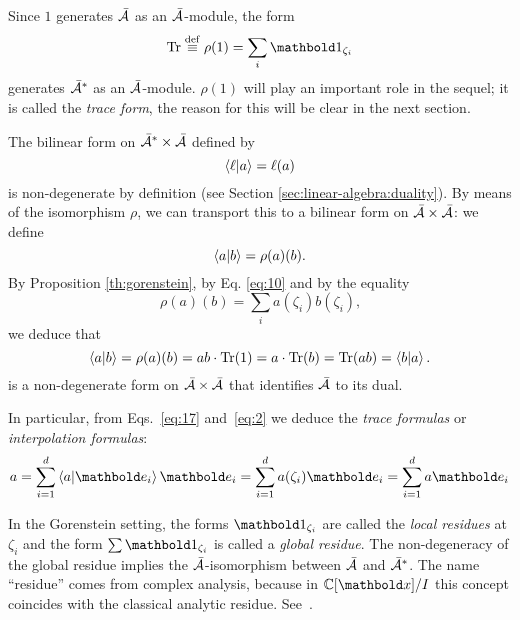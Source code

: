 Since $1$ generates $\bar{\mathcal{A}}$ as an $\bar{\mathcal{A}}$-module, the form
\begin{equation}
  \label{eq:7}
  \Tr \eqdef \rho(1) = \sum_i\basis{1}_{\zeta_i}
\end{equation}
generates $\bar{\mathcal{A}}^\ast$ as an $\bar{\mathcal{A}}$-module.
$\rho(1)$ will play an important role in the sequel; it is called the
\emph{trace form}, the reason for this will be clear in the next
section.

The bilinear form on $\bar{\mathcal{A}}^\ast\times\bar{\mathcal{A}}$
defined by
\begin{equation}
  \label{eq:11}
  \left\langle \ell \middle| a \right\rangle = \ell(a)
\end{equation}
is non-degenerate by definition (see Section
\ref{sec:linear-algebra:duality}). By means of the isomorphism $\rho$,
we can transport this to a bilinear form on
$\bar{\mathcal{A}}\times\bar{\mathcal{A}}$: we define
\begin{equation}
  \label{eq:15}
  \left\langle a \middle| b \right\rangle=\rho(a)(b)
  \text{.}
\end{equation}
By Proposition \ref{th:gorenstein}, by Eq. \eqref{eq:10} and by the
equality
\begin{equation}
  \label{eq:16}
  \rho(a)(b) = \sum_i a(\zeta_i)b(\zeta_i)
  \text{,}
\end{equation}
we deduce that
\begin{equation}
  \label{eq:17}
  \left\langle a \middle| b \right\rangle = \rho(a)(b) = ab\cdot\operatorname{Tr}(1) = a\cdot\operatorname{Tr}(b) = \operatorname{Tr}(ab) = \left\langle b \middle| a \right\rangle
  \text{.}
\end{equation}
is a non-degenerate form on $\bar{\mathcal{A}}\times\bar{\mathcal{A}}$
that identifies $\bar{\mathcal{A}}$ to its dual.

In particular, from Eqs.~\eqref{eq:17} and~\eqref{eq:2} we deduce the
\emph{trace formulas} or \emph{interpolation formulas}:
\begin{equation}
  \label{eq:21}
  a = \sum_{i=1}^d\braket{a}{\basis{e}_i}\basis{e}_i=\sum_{i=1}^da(\zeta_i)\basis{e}_i=\sum_{i=1}^da\basis{e_i}
\end{equation}

\begin{nota}
  In the Gorenstein setting, the forms $\basis{1}_{\zeta_i}$ are
  called the \emph{local residues} at $\zeta_i$ and the form
  $\sum\basis{1}_{\zeta_i}$ is called a \emph{global residue}. The
  non-degeneracy of the global residue implies the
  $\bar{\mathcal{A}}$-isomorphism between $\bar{\mathcal{A}}$ and
  $\bar{\mathcal{A}}^\ast$.  The name ``residue'' comes from complex
  analysis, because in $\C[\lst{x}]/I$ this concept coincides with the
  classical analytic
  residue. See~\cite{bykov+kytmanov+lazman,mourrain+elkadi}.
\end{nota}


